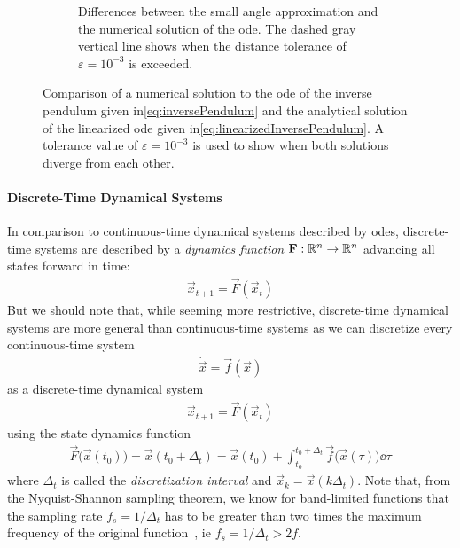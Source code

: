 \begin{figure}
\begin{subfigure}[t]{0.5\linewidth}
					\caption{Differences between the small angle approximation and the numerical solution of the \ac{ode}. The dashed gray vertical line shows when the distance tolerance of \( \varepsilon = 10^{-3} \) is exceeded.}
				\end{subfigure}
				\caption{Comparison of a numerical solution to the \ac{ode} of the inverse pendulum given in\eqref{eq:inversePendulum} and the analytical solution of the linearized \ac{ode} given in\eqref{eq:linearizedInversePendulum}. A tolerance value of \( \varepsilon = 10^{-3} \) is used to show when both solutions diverge from each other.}
				\label{fig:inversePendulumApprox}
			\end{figure}

		\paragraph{Discrete-Time Dynamical Systems}
			In comparison to continuous-time dynamical systems described by \acp{ode}, discrete-time systems are described by a \emph{dynamics function} \( \boldsymbol{\mathrm{F}} : \mathbb{R}^n \to \mathbb{R}^n \) advancing all states forward in time:
			\begin{align*}
				\vec{x}_{t + 1} = \vec{F}(\vec{x}_t)
			\end{align*}
			But we should note that, while seeming more restrictive, discrete-time dynamical systems are more general than continuous-time systems as we can discretize every continuous-time system
			\begin{align*}
				\dot{\vec{x}} = \vec{f}(\vec{x})
			\end{align*}
			as a discrete-time dynamical system
			\begin{align*}
				\vec{x}_{t + 1} = \vec{F}(\vec{x}_t)
			\end{align*}
			using the state dynamics function
			\begin{align*}
				\vec{F}\big(\vec{x}(t_0)\big) = \vec{x}(t_0 + \Delta_t) = \vec{x}(t_0) + \int_{t_0}^{t_0 + \Delta_t} \! \vec{f}\big(\vec{x}(\tau)\big) \dd{\tau}
			\end{align*}
			where \( \Delta_t \) is called the \emph{discretization interval} and \( \vec{x}_k = \vec{x}(k \Delta_t) \). Note that, from the Nyquist-Shannon sampling theorem, we know for band-limited functions that the sampling rate \( f_s = 1/\Delta_t \) has to be greater than two times the maximum frequency of the original function~\cite{shannonCommunicationPresenceNoise1949}, \ac{ie} \( f_s = 1/\Delta_t > 2 f \).

